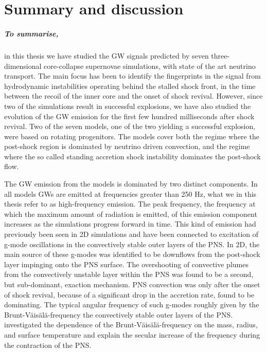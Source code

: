 \chapter{Summary and discussion}
\paragraph{To summarise,}
in this thesis we have studied the GW signals predicted
by seven three-dimensional core-collapse supernovae simulations, with state of the art 
neutrino transport. The main focus has been to identify the fingerprints in the signal
from hydrodynamic instabilities operating behind the stalled shock front, in the time between the
recoil of the inner core and the onset of shock revival. However, since two of the simulations
result in successful explosions, we have also studied the evolution of the GW emission
for the first few hundred milliseconds after shock revival. Two of the seven models, one of the two
yielding a successful explosion, were based on rotating progenitors. The models cover both the
regime where the post-shock region is dominated by neutrino driven convection, and the regime where
the so called standing accretion shock instability dominates the post-shock flow.

The GW emission from the models is dominated by two distinct components. In all models
GWs are emitted at frequencies greater than 250 Hz, what we in this thesis refer to as 
high-frequency emission. The peak frequency, the frequency at which the maximum amount of radiation 
is emitted, of this emission component increases as the simulations progress forward in time. 
This kind of emission had previously been seen in 2D simulations \citep{marek_08,murphy_09,mueller_13}
and have been connected to excitation of g-mode oscillations in the convectively stable outer layers of the PNS.
In 2D, the main source of these g-modes was identified to be downflows from the post-shock layer impinging onto the PNS surface.
The overshooting of convective plumes from the convectively unstable layer within the PNS was found to be a second, but sub-dominant, exaction
mechanism. PNS convection was only after the onset of shock revival, because of a significant drop in the accretion rate, found to 
be dominating.  The typical angular frequency of such g-modes roughly given by the Brunt-V\"{a}is\"{a}l\"{a}-frequency
the convectively stable outer layers of the PNS. \citet{mueller_13} investigated the dependence
of the Brunt-V\"{a}is\"{a}l\"{a}-frequency on the mass, radius, and surface temperature and explain the secular
increase of the frequency during the contraction of the PNS.

